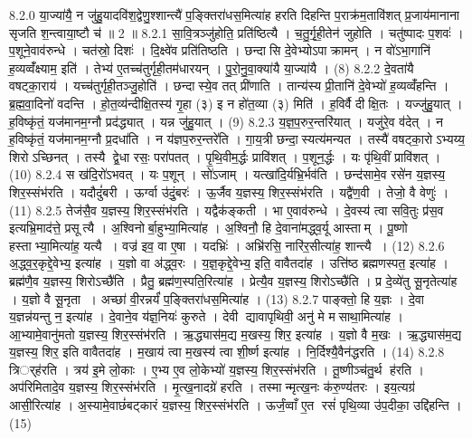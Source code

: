 8.2.0
या॒ज्या॑यै॒ न जु॑हु॒यादवि॑श॒द्वेणु॒श्शान्त्यै॑ प॒ङ्क्तिरा॑धस॒मित्या॑ह हरति दिहन्ति प॒राक्र॑म॒तावि॑शत् प्र॒जाय॑मानाना सृजति श॒न्त्वाया॒ष्टौ च॑ ॥ 2 ॥
8.2.1
सा॒वि॒त्रञ्जु॑होति॒ प्रति॑ष्ठित्यै । च॒तु॒र्गृ॒ही॒तेन॑ जुहोति । चतु॑ष्पादः प॒शवः॑ । प॒शूने॒वाव॑रुन्धे । चत॑स्रो॒ दिशः॑ । दि॒क्ष्वे॑व प्रति॑तिष्ठति । छन्दासि दे॒वेभ्योऽपाक्रामन् । न वो॑ऽभा॒गानि॑ ह॒व्यव्वँ॑क्ष्याम॒ इति॑ । तेभ्य॑ ए॒तच्च॑तुर्गृही॒तम॑धारयन् । पु॒रो॒नु॒वा॒क्या॑यै या॒ज्या॑यै । (8)
8.2.2
दे॒वता॑यै वषट्का॒राय॑ । यच्च॑तुर्गृही॒तञ्जु॒होति॑ । छन्दास्ये॒व तत् प्री॑णाति । तान्य॑स्य प्री॒तानि॑ दे॒वेभ्यो॑ ह॒व्यव्वँ॑हन्ति । ब्र॒ह्म॒वा॒दिनो॑ वदन्ति । हो॒त॒व्य॑न्दीक्षि॒तस्य॑ गृ॒हा (३) इ न हो॑त॒व्या (३) मिति॑ । ह॒विर्वै दीक्षि॒तः । यज्जु॑हु॒यात् । ह॒विष्कृ॑तं॒ यज॑मानम॒ग्नौ प्रद॑द्ध्यात् । यन्न जु॑हु॒यात् । (9)
8.2.3
य॒ज्ञ॒प॒रुर॒न्तरि॑यात् । यजु॑रे॒व व॑देत् । न ह॒विष्कृ॑तं॒ यज॑मानम॒ग्नौ प्र॒दधा॑ति । न य॑ज्ञप॒रुर॒न्तरे॑ति । गा॒य॒त्री छन्दा॒स्यत्य॑मन्यत । तस्यै॑ वषट्का॒रोऽभ्यय्य॒ शिरोऽच्छिनत् । तस्यै द्वे॒धा रसः॒ परा॑पतत् । पृ॒थि॒वीम॒र्द्धः प्रावि॑शत् । प॒शून॒र्द्धः । यः पृ॑थि॒वीं प्रावि॑शत् । (10)
8.2.4
स ख॑दि॒रो॑ऽभवत् । यः प॒शून् । सो॑ऽजाम् । यत्खा॑दि॒र्यभ्रि॒र्भव॑ति । छन्द॑सामे॒व रसे॑न य॒ज्ञस्य॒ शिर॒स्संभ॑रति । यदौदुं॑बरी । ऊर्ग्वा उ॑दुं॒बरः॑ । ऊ॒र्जैव य॒ज्ञस्य॒ शिर॒स्संभ॑रति । यद्वै॑ण॒वी । तेजो॒ वै वेणुः॑ । (11)
8.2.5
तेज॑सै॒व य॒ज्ञस्य॒ शिर॒स्संभ॑रति । यद्वैक॑ङ्कती । भा ए॒वाव॑रुन्धे । दे॒वस्य॑ त्वा सवि॒तुः प्र॑स॒व इत्यभ्रि॒माद॑त्ते॒ प्रसूत्यै । अ॒श्विनोर्बा॒हुभ्या॒मित्या॑ह । अ॒श्विनौ॒ हि दे॒वाना॑मद्ध्व॒र्यू आस्ताम् । पू॒ष्णो हस्ताभ्या॒मित्या॑ह॒ यत्यै । वज्र॑ इव॒ वा ए॒षा । यदभ्रिः॑ । अभ्रि॑रसि॒ नारि॑र॒सीत्या॑ह॒ शान्त्यै । (12)
8.2.6
अ॒द्ध्व॒र॒कृद्दे॒वेभ्य॒ इत्या॑ह । य॒ज्ञो वा अ॑द्ध्व॒रः । य॒ज्ञ॒कृद्दे॒वेभ्य॒ इति॒ वावैतदा॑ह । उत्ति॑ष्ठ ब्रह्मणस्पत॒ इत्या॑ह । ब्रह्म॑णै॒व य॒ज्ञस्य॒ शिरोऽच्छै॑ति । प्रैतु॒ ब्रह्म॑ण॒स्पति॒रित्या॑ह । प्रेत्यै॒व य॒ज्ञस्य॒ शिरोऽच्छै॑ति । प्र दे॒व्ये॑तु सू॒नृतेत्या॑ह । य॒ज्ञो वै सू॒नृता । अच्छा॑ वी॒रन्नर्यं॑ प॒ङ्क्तिरा॑धस॒मित्या॑ह । (13)
8.2.7
पाङ्क्तो॒ हि य॒ज्ञः । दे॒वा य॒ज्ञन्न॑यन्तु न॒ इत्या॑ह । दे॒वाने॒व य॑ज्ञ॒नियः॑ कुरुते । देवी द्यावापृथिवी॒ अनु॑ मे मसाथा॒मित्या॑ह । आ॒भ्यामे॒वानु॑मतो य॒ज्ञस्य॒ शिर॒स्संभ॑रति । ऋ॒द्ध्यास॑म॒द्य म॒खस्य॒ शिर॒ इत्या॑ह । य॒ज्ञो वै म॒खः । ऋ॒द्ध्यास॑म॒द्य य॒ज्ञस्य॒ शिर॒ इति वावैतदा॑ह । म॒खाय॑ त्वा म॒खस्य॑ त्वा शी॒र्ष्ण इत्या॑ह । नि॒र्दिश्यै॒वैन॑द्धरति । (14)
8.2.8
त्रिर््ह॑रति । त्रय॑ इ॒मे लो॒काः । ए॒भ्य ए॒व लो॒केभ्यो॑ य॒ज्ञस्य॒ शिर॒स्संभ॑रति । तू॒ष्णीञ्च॑तु॒र्थ ह॑रति । अप॑रिमितादे॒व य॒ज्ञस्य॒ शिर॒स्संभ॑रति । मृ॒त्ख॒नादग्रे॑ हरति । तस्मान्मृत्ख॒नः क॑रु॒ण्य॑तरः । इय॒त्यग्र॑ आसी॒रित्या॑ह । अ॒स्यामे॒वाछं॑बट्कारं य॒ज्ञस्य॒ शिर॒स्संभ॑रति । ऊर्जं॒व्वाँ ए॒त रसं॑ पृथि॒व्या उ॑प॒दीका॒ उद्दि॑हन्ति । (15)
